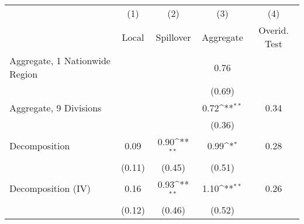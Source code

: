 \def\sym#1{\ifmmode^{#1}\else\(^{#1}\)\fi}          \begin{tabular}{l*{4}{c}}          \hline
  & (1) & (2) & (3)  & (4) \\ & Local & Spillover & Aggregate  & Overid. Test \\ \hline
Aggregate, 1 Nationwide Region&                     &                     &        0.76         &            \\
            &                     &                     &      (0.69)         &            \\
Aggregate, 9 Divisions&                     &                     &        0.72\sym{**} &        0.34\\
            &                     &                     &      (0.36)         &            \\
Decomposition&        0.09         &        0.90\sym{**} &        0.99\sym{*}  &        0.28\\
            &      (0.11)         &      (0.45)         &      (0.51)         &            \\
Decomposition (IV)&        0.16         &        0.93\sym{**} &        1.10\sym{**} &        0.26\\
            &      (0.12)         &      (0.46)         &      (0.52)         &            \\
\hline          \end{tabular}
